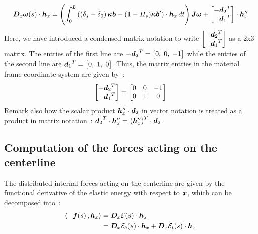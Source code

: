 \begin{equation}
			\pdiffof{x}{\vect{\omega}}{s}{\vect{h}_x}
	= 	\left(\int_0^L \left(\left(\delta_s-\delta_0\right)\vect{\kappa b} - (1-H_s)\vect{\kappa b}'\right)\cdot  \vect{h}_x \,dt\right)\mat{J}\vect{\omega}+
		\begin{bmatrix*}[r]
			-{\vect{d}_2}^T\\
			{\vect{d}_1}^T\\
		\end{bmatrix*}\cdot \vect{h}_x''
\label{eq:dwdx}
\end{equation}
Here, we have introduced a condensed matrix notation to write $\begin{bmatrix*}[r] -{\vect{d}_2}^T\\ {\vect{d}_1}^T\\ \end{bmatrix*}$ as a 2x3 matrix. The entries of the first line are $-{\boldsymbol{d}_2}^T = \begin{bmatrix} 0,\;0,\;-1 \end{bmatrix}$ while the entries of the second line are ${\boldsymbol{d}_1}^T = \begin{bmatrix} 0,\;1,\;0 \end{bmatrix}$. Thus, the matrix entries in the material frame coordinate system are given by~:
\begin{equation}
	\begin{bmatrix*}[r] -{\vect{d}_2}^T\\ {\vect{d}_1}^T \end{bmatrix*}
	=
	\begin{bmatrix} 0 & 0 & -1 \\ 0 & 1 & 0 \end{bmatrix}
\end{equation}
Remark also how the scalar product $\boldsymbol{h}_x''\cdot\boldsymbol{d}_2$ in vector notation is treated as a product in matrix notation~: ${\boldsymbol{d}_2}^T \cdot \boldsymbol{h}_x'' =  {(\boldsymbol{h}_x'')}^T \cdot {\boldsymbol{d}_2}$.

\subsection{Computation of the forces acting on the centerline}
The distributed internal forces acting on the centerline are given by the functional derivative of the elastic energy with respect to $\boldsymbol{x}$, which can be decomposed into~:
\begin{equation}
	\begin{aligned}
	\langle -\boldsymbol{f}(s)\,, \boldsymbol{h}_x\rangle
	&= \boldsymbol{D}_x\mathcal{E}(s)\cdot\boldsymbol{h}_x \\
	&= \boldsymbol{D}_x\mathcal{E}_b(s)\cdot\boldsymbol{h}_x + \boldsymbol{D}_x\mathcal{E}_t(s)\cdot\boldsymbol{h}_x \\
	\end{aligned}
\label{eq:dEdx_def}
\end{equation}

